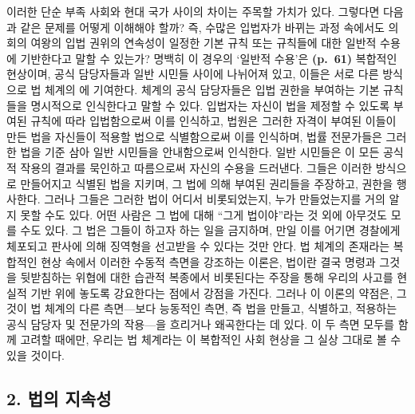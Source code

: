 이러한 단순 부족 사회와 현대 국가 사이의 차이는 주목할 가치가 있다.
그렇다면 다음과 같은 문제를 어떻게 이해해야 할까? 즉, 수많은 입법자가
바뀌는 과정 속에서도 의회의 여왕의 입법 권위의 연속성이 일정한 기본 규칙
또는 규칙들에 대한 일반적 수용에 기반한다고 말할 수 있는가? 명백히 이
경우의 `일반적 수용'은 \textbf{(p.~61)} 복합적인 현상이며, 공식
담당자들과 일반 시민들 사이에 나뉘어져 있고, 이들은 서로 다른 방식으로
법 체계의 에 기여한다. 체계의 공식 담당자들은 입법
권한을 부여하는 기본 규칙들을 명시적으로 인식한다고 말할 수 있다.
입법자는 자신이 법을 제정할 수 있도록 부여된 규칙에 따라 입법함으로써
이를 인식하고, 법원은 그러한 자격이 부여된 이들이 만든 법을 자신들이
적용할 법으로 식별함으로써 이를 인식하며, 법률 전문가들은 그러한 법을
기준 삼아 일반 시민들을 안내함으로써 인식한다. 일반 시민들은 이 모든
공식적 작용의 결과를 묵인하고 따름으로써 자신의 수용을 드러낸다. 그들은
이러한 방식으로 만들어지고 식별된 법을 지키며, 그 법에 의해 부여된
권리들을 주장하고, 권한을 행사한다. 그러나 그들은 그러한 법이 어디서
비롯되었는지, 누가 만들었는지를 거의 알지 못할 수도 있다. 어떤 사람은 그
법에 대해 ``그게 법이야''라는 것 외에 아무것도 모를 수도 있다. 그 법은
그들이 하고자 하는 일을 금지하며, 만일 이를 어기면 경찰에게 체포되고
판사에 의해 징역형을 선고받을 수 있다는 것만 안다. 법 체계의 존재라는
복합적인 현상 속에서 이러한 수동적 측면을 강조하는 이론은, 법이란 결국
명령과 그것을 뒷받침하는 위협에 대한 습관적 복종에서 비롯된다는 주장을
통해 우리의 사고를 현실적 기반 위에 놓도록 강요한다는 점에서 강점을
가진다. 그러나 이 이론의 약점은, 그것이 법 체계의 다른 측면---보다
능동적인 측면, 즉 법을 만들고, 식별하고, 적용하는 공식 담당자 및
전문가의 작용---을 흐리거나 왜곡한다는 데 있다. 이 두 측면 모두를 함께
고려할 때에만, 우리는 법 체계라는 이 복합적인 사회 현상을 그 실상 그대로
볼 수 있을 것이다.

\subsection{2. 법의 지속성}\label{uxbc95uxc758-uxc9c0uxc18duxc131}

